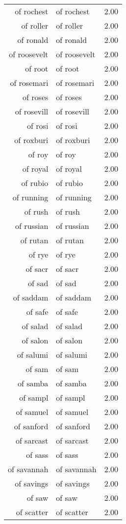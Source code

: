 \begin{table}[ht]
\begin{tabular}{rlr}
  of rochest & of rochest & 2.00 \\ 
  of roller & of roller & 2.00 \\ 
  of ronald & of ronald & 2.00 \\ 
  of roosevelt & of roosevelt & 2.00 \\ 
  of root & of root & 2.00 \\ 
  of rosemari & of rosemari & 2.00 \\ 
  of roses & of roses & 2.00 \\ 
  of rosevill & of rosevill & 2.00 \\ 
  of rosi & of rosi & 2.00 \\ 
  of roxburi & of roxburi & 2.00 \\ 
  of roy & of roy & 2.00 \\ 
  of royal & of royal & 2.00 \\ 
  of rubio & of rubio & 2.00 \\ 
  of running & of running & 2.00 \\ 
  of rush & of rush & 2.00 \\ 
  of russian & of russian & 2.00 \\ 
  of rutan & of rutan & 2.00 \\ 
  of rye & of rye & 2.00 \\ 
  of sacr & of sacr & 2.00 \\ 
  of sad & of sad & 2.00 \\ 
  of saddam & of saddam & 2.00 \\ 
  of safe & of safe & 2.00 \\ 
  of salad & of salad & 2.00 \\ 
  of salon & of salon & 2.00 \\ 
  of salumi & of salumi & 2.00 \\ 
  of sam & of sam & 2.00 \\ 
  of samba & of samba & 2.00 \\ 
  of sampl & of sampl & 2.00 \\ 
  of samuel & of samuel & 2.00 \\ 
  of sanford & of sanford & 2.00 \\ 
  of sarcast & of sarcast & 2.00 \\ 
  of sass & of sass & 2.00 \\ 
  of savannah & of savannah & 2.00 \\ 
  of savings & of savings & 2.00 \\ 
  of saw & of saw & 2.00 \\ 
  of scatter & of scatter & 2.00 \\ 

\end{tabular}
\end{table}
